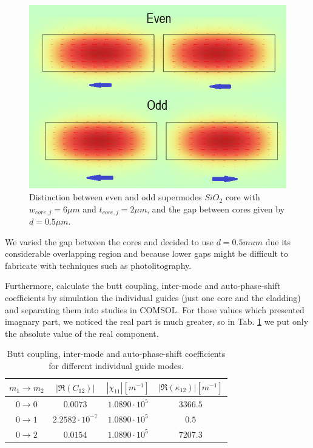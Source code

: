 \documentclass[conference, a4paper]{IEEEtran}
\begin{document}
\begin{figure}[H]
    \centering
    \includegraphics[scale=0.4]{even_odd_supermodes.png}
    \caption{Distinction between even and odd supermodes $SiO_2$ core with $w_{core, j} = 6\mu m$ and $t_{core, j} = 2\mu m$, and the gap between cores given by $d = 0.5\mu m$.}
    \label{fig:splitter_identical_parity}
\end{figure} 

We varied the gap between the cores and decided to use $d = 0.5mu m$ due its considerable overlapping region and because lower gaps might be difficult to fabricate with techniques such as photolitography.

Furthermore, calculate the butt coupling, inter-mode and auto-phase-shift coefficients by simulation the individual guides (just one core and the cladding) and separating them into studies in COMSOL. For those values which presented imagnary part, we noticed the real part is much greater, so in Tab. \ref{tab:splitter_identical_coefficients} we put only the absolute value of the real component.


\begin{table}[H]
    \centering
    \begin{tabular}{cccc}
        \toprule
        $m_1 \rightarrow m_2$ & $|\Re(C_{12})|$ & $|\chi_{11}| [m^{-1}]$ & $|\Re(\kappa_{12})| [m^{-1}]$ \\ 
        \midrule
        $0 \rightarrow 0$ & $0.0073$ & $1.0890 \cdot 10^5$ & $3366.5$ \\
        $0 \rightarrow 1$ & $2.2582 \cdot 10^{-7}$ & $1.0890 \cdot 10^5$ & $0.5$ \\
        $0 \rightarrow 2$ & $0.0154$ & $1.0890 \cdot 10^5$ & $7207.3$ \\
        \bottomrule
    \end{tabular}
    \caption{Butt coupling, inter-mode and auto-phase-shift coefficients for different individual guide modes.}
    \label{tab:splitter_identical_coefficients}
\end{table}
\end{document}

